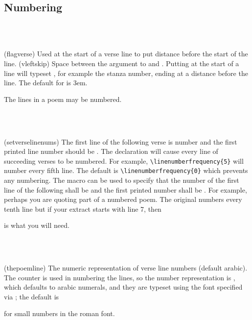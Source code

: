 \subsection{Numbering}

\begin{syntax}
\cmd{\flagverse} \\
\lnc{\vleftskip} \\
\end{syntax}
\glossary(flagverse)%
  {}%
  {Used at the start of a verse line to put  distance
   before the start of the line.}
\glossary(vleftskip)%
  {}%
  {Space between the argument to  and .}
Putting \cmd{\flagverse} at the start of a line will typeset ,
for example the stanza number,
ending at a distance \lnc{\vleftskip} before the line. The default for
\lnc{\vleftskip} is 3em.

The lines in a poem may be numbered.

\begin{syntax}
\cmd{\linenumberfrequency} \\
\cmd{\setverselinenums} \\
\end{syntax}
\glossary(setverselinenums)%
  {}%
  {The first line of the following verse is number  and the
   first printed line number should be .}
The declaration \cmd{\linenumberfrequency} will cause every 
 line 
of succeeding verses to be numbered. 
For example, 
\verb?\linenumberfrequency{5}?
will number every fifth line. The default is \verb?\linenumberfrequency{0}? 
which prevents any numbering. The \cmd{\setverselinenums} macro can be
used to specify that the number of the first line of the following 
shall be  and the first printed number shall be .
For example, perhaps you are quoting part of a numbered poem. The original
numbers every tenth line but if your extract starts with line 7, then
\begin{lcode}
\end{lcode}
is what you will need.

\begin{syntax}
\cmd{\thepoemline} \\
\cmd{\linenumberfont} \\
\end{syntax}
\glossary(thepoemline)%
  {}%
  {The numeric representation of verse line numbers (default arabic).}
    The  counter is used in numbering the lines, so the
number representation is \cmd{\thepoemline}, which defaults to 
arabic numerals, and they are typeset using the font 
specified
via \cmd{\linenumberfont}; the default is 
\begin{lcode}
\linenumberfont{\small\rmfamily}
\end{lcode}
for small numbers in the roman font. 

